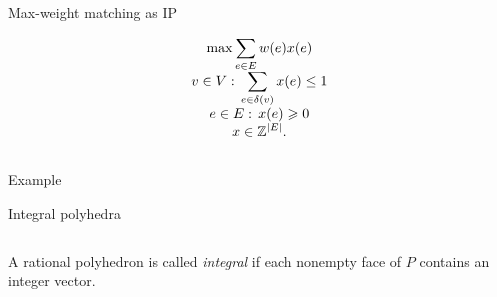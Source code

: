 \begin{frame}{Max-weight matching as IP} 


  \begin{equation*}
  \label{eq:45}
  \begin{array}{c}\displaystyle 
    \max \sum_{e \in E} w(e) x(e) \\
    \displaystyle 
    v \in V: \, \sum_{e \in \delta(v)} x(e)\leq1 \\
    \displaystyle 
    e \in E:\,  x(e)  \geqslant0 \\
    \displaystyle 
    x \in \mathbb{Z}^{|E|}.
  \end{array}
\end{equation*}

   \begin{columns}
    \begin{column}{.5\textwidth}
      
    \end{column}
    \begin{column}{.5\textwidth}
      
    \end{column}       
  \end{columns}
\end{frame}



\begin{frame}{Example} 
  
\end{frame}



\begin{frame}{Integral polyhedra}

  




   \begin{columns}
    \begin{column}{.5\textwidth}
      \begin{definition}
  \label{def:12}  
  A rational polyhedron   is called \emph{integral} 
  if  each nonempty face of $P$ contains an integer vector. 
\end{definition}
    \end{column}
    \begin{column}{.5\textwidth}
      
    \end{column}       
  \end{columns}
\end{frame}



